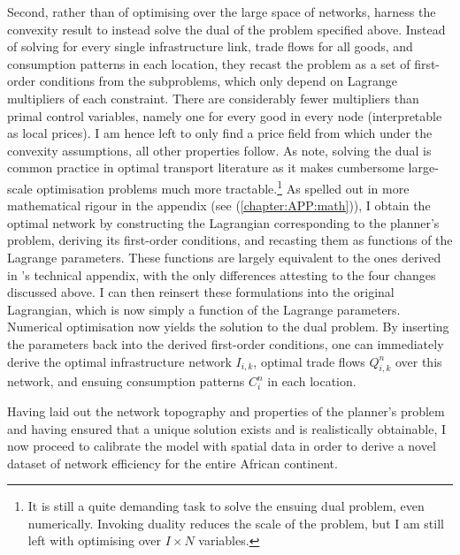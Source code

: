 \documentclass[11pt, oneside]{article}   	%
\let\oldref\ref
\renewcommand{\ref}[1]{(\oldref{#1})}
\begin{document}
Second, rather than of optimising over the large space of networks, \citeauthor{fajgelbaum_optimal_2017} harness the convexity result to instead solve the dual of the problem specified above. Instead of solving for every single infrastructure link, trade flows for all goods, and consumption patterns in each location, they recast the problem as a set of first-order conditions from the subproblems, which only depend on Lagrange multipliers of each constraint. There are considerably fewer multipliers than primal control variables, namely one for every good in every node (interpretable as local prices). I am hence left to only find a price field from which under the convexity assumptions, all other properties follow. As \citeauthor{fajgelbaum_optimal_2017} note, solving the dual is common practice in optimal transport literature as it makes cumbersome large-scale optimisation problems much more tractable.\footnote{It is still a quite demanding  task to solve the ensuing dual problem, even numerically. Invoking duality reduces the scale of the problem, but I am still left with optimising over $I \times N$ variables.} As spelled out in more mathematical rigour in the appendix (see \ref{chapter:APP:math}), I obtain the optimal network by constructing the Lagrangian corresponding to the planner's problem, deriving its first-order conditions, and recasting them as functions of the Lagrange parameters. These functions are largely equivalent to the ones derived in \citeauthor{fajgelbaum_optimal_2017}'s technical appendix, with the only differences attesting to the four changes discussed above. I can then reinsert these formulations into the original Lagrangian, which is now simply a function of the Lagrange parameters. Numerical optimisation now yields the solution to the dual problem. By inserting the parameters back into the derived first-order conditions, one can immediately derive the optimal infrastructure network $I_{i,k}$, optimal trade flows $Q_{i,k}^{n}$ over this network, and ensuing consumption patterns $C_{i}^{n}$ in each location.

Having laid out the network topography and properties of the planner's problem and having ensured that a unique solution exists and is realistically obtainable, I now proceed to calibrate the model with spatial data in order to derive a novel dataset of network efficiency for the entire African continent.
\end{document}
